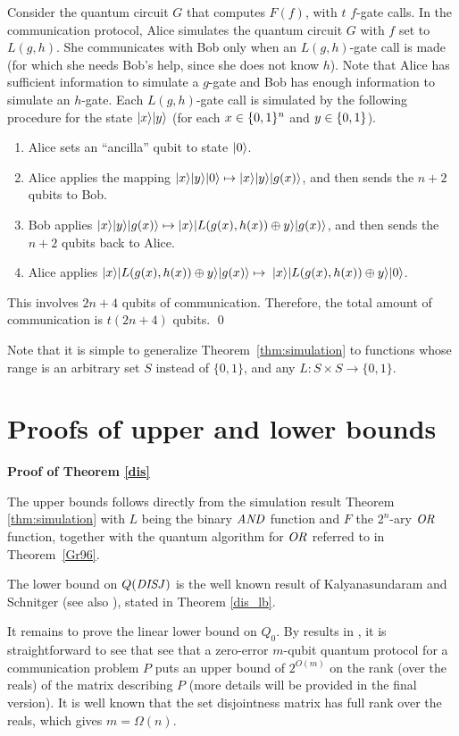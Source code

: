 \prf
Consider the quantum circuit $G$ that computes $F(f)$, with $t$ $f$-gate 
calls.
In the communication protocol, Alice simulates the quantum circuit $G$ 
with $f$ set to $L(g,h)$.
She communicates with Bob only when an $L(g,h)$-gate call is made 
(for which she needs Bob's help, since she does not know $h$).
Note that Alice has sufficient information to simulate a $g$-gate 
and Bob has enough information to simulate an $h$-gate.
Each $L(g,h)$-gate call is simulated by the following procedure 
for the state $\mbox{$| x \rangle$}\mbox{$| y \rangle$}$ (for each $x \in \01^n$ and $y \in \01$).
\begin{enumerate}
\item Alice sets an ``ancilla'' qubit to state $\mbox{$| 0 \rangle$}$.
\item Alice applies the mapping 
$\mbox{$| x \rangle$}\mbox{$| y \rangle$}\mbox{$| 0 \rangle$} \mapsto 
\mbox{$| x \rangle$}\mbox{$| y \rangle$}\mbox{$| g(x) \rangle$}$, and then sends the $n+2$ qubits to Bob.
\item Bob applies 
$\mbox{$| x \rangle$}\mbox{$| y \rangle$}\mbox{$| g(x) \rangle$} \mapsto 
\mbox{$| x \rangle$}\mbox{$| L(g(x),h(x)) \oplus y \rangle$}\mbox{$| g(x) \rangle$}$, 
and then sends the $n+2$ qubits back to Alice.
\item Alice applies
$\mbox{$| x \rangle$}\mbox{$| L(g(x),h(x)) \oplus y \rangle$}\mbox{$| g(x) \rangle$} \mapsto$\newline
$\mbox{$| x \rangle$}\mbox{$| L(g(x),h(x)) \oplus y \rangle$}\mbox{$| 0 \rangle$}$.
\end{enumerate}
This involves $2n + 4$ qubits of communication.
Therefore, the total amount of communication is $t(2n+4)$ qubits.
\qed

Note that it is simple to generalize Theorem~\ref{thm:simulation} to
functions whose range is an arbitrary set $S$ instead of $\{0,1\}$,
and any $L:S\times S \rightarrow \{0,1\}$.

\section{Proofs of upper and lower bounds}

\noindent
{\bf Proof of Theorem \ref{dis}}

The upper bounds follows directly from the simulation result Theorem 
\ref{thm:simulation} with $L$ being the binary $\mbox{\it AND\/}$ function and $F$ the 
$2^n$-ary $\mbox{\it OR\/}$ function, together with the quantum algorithm for $\mbox{\it OR\/}$ 
referred to in Theorem~\ref{Gr96}.

The lower bound on $Q(\mbox{\it DISJ\/})$ is the well known result of
Kalyanasundaram and Schnitger \cite{KS87} (see also \cite{Raz90}), stated
in Theorem \ref{dis_lb}.

It remains to prove the linear lower bound on $Q_0$.
By results in \cite{Kr95}, it is straightforward to see that 
see  that a zero-error $m$-qubit quantum protocol for a communication 
problem $P$ puts an upper bound of $2^{O(m)}$ on the rank (over the reals) 
of the matrix describing $P$ (more details will be provided in the final 
version).
It is well known that the set disjointness matrix has full rank over 
the reals, which gives $m = \Omega(n)$.\ee

